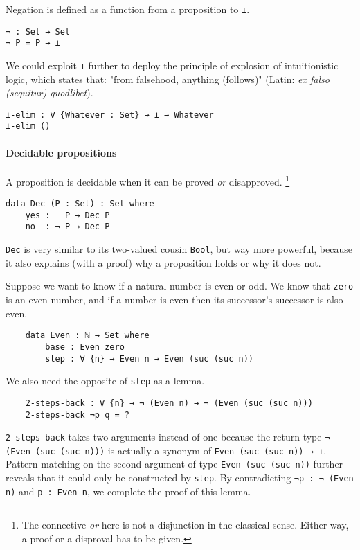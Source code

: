 \documentclass[../thesis.tex]{subfiles}
\begin{document}
Negation is defined as a function from a proposition to {\lstinline|⊥|}.

\begin{lstlisting}
¬ : Set → Set
¬ P = P → ⊥
\end{lstlisting}

We could exploit {\lstinline|⊥|} further to deploy the principle of explosion
of intuitionistic logic, which states that: "from falsehood, anything (follows)"
(Latin: \textit{ex falso (sequitur) quodlibet}).

\begin{lstlisting}
⊥-elim : ∀ {Whatever : Set} → ⊥ → Whatever
⊥-elim ()
\end{lstlisting}


\paragraph{Decidable propositions}

A proposition is decidable when it can be proved \textit{or} disapproved.
\footnote{The connective \textit{or} here is not a disjunction in the classical sense.
Either way, a proof or a disproval has to be given.}

\begin{lstlisting}
data Dec (P : Set) : Set where
    yes :   P → Dec P
    no  : ¬ P → Dec P
\end{lstlisting}

{\lstinline|Dec|} is very similar to its two-valued cousin {\lstinline|Bool|},
but way more powerful, because it also explains (with a proof) why a proposition
holds or why it does not.

Suppose we want to know if a natural number is even or odd. We know that {\lstinline|zero|}
is an even number, and if a number is even then its successor's successor is also even.

\begin{lstlisting}
    data Even : ℕ → Set where
        base : Even zero
        step : ∀ {n} → Even n → Even (suc (suc n))
\end{lstlisting}

We also need the opposite of {\lstinline|step|} as a lemma.

\begin{lstlisting}
    2-steps-back : ∀ {n} → ¬ (Even n) → ¬ (Even (suc (suc n)))
    2-steps-back ¬p q = ?
\end{lstlisting}

{\lstinline|2-steps-back|} takes two arguments instead of one because the return
type {\lstinline|¬ (Even (suc (suc n)))|} is actually a synonym of
{\lstinline|Even (suc (suc n)) → ⊥|}. Pattern matching on the second argument
of type {\lstinline|Even (suc (suc n))|} further reveals that it could only be
constructed by {\lstinline|step|}.  By contradicting {\lstinline|¬p : ¬ (Even n)|}
and {\lstinline|p : Even n|}, we complete the proof of this lemma.
\end{document}
